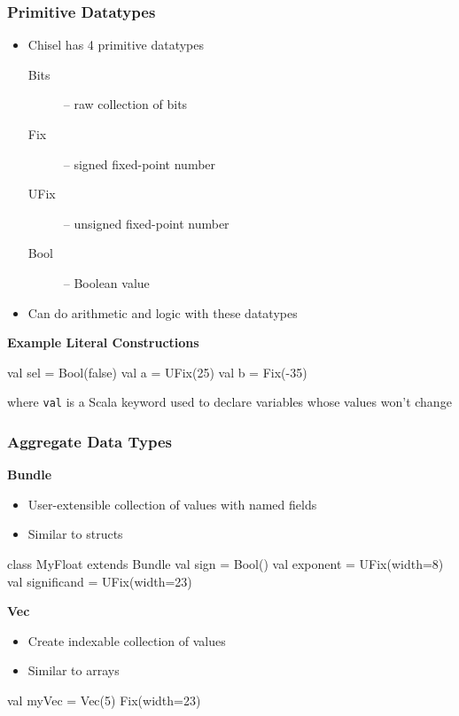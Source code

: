 \documentclass[xcolor=pdflatex,dvipsnames,table]{beamer}
\begin{document}
\begin{frame}[fragile]
\frametitle{Primitive Datatypes}
\begin{itemize}
\item{Chisel has 4 primitive datatypes}
\begin{description}
\item[Bits]  -- raw collection of bits
\item[Fix]   -- signed fixed-point number
\item[UFix] -- unsigned fixed-point number
\item[Bool] -- Boolean value
\end{description}
\item Can do arithmetic and logic with these datatypes
\end{itemize}

\textbf{Example Literal Constructions}
\begin{scala}
val sel = Bool(false)
val a   = UFix(25)
val b   = Fix(-35)
\end{scala}
where \verb+val+ is a Scala keyword used to declare variables whose values won't change
\end{frame}

\begin{frame}[fragile]
\frametitle{Aggregate Data Types}

\textbf{Bundle}

\begin{itemize}
\item User-extensible collection of values with named fields
\item Similar to structs
\end{itemize}

\begin{footnotesize}
\begin{scala}
class MyFloat extends Bundle{
  val sign        = Bool()
  val exponent    = UFix(width=8)
  val significand = UFix(width=23)
}
\end{scala}
\end{footnotesize}

\textbf{Vec}

\begin{itemize}
\item Create indexable collection of values
\item Similar to arrays
\end{itemize}

\begin{footnotesize}
\begin{scala}
val myVec = Vec(5){ Fix(width=23) }
\end{scala}
\end{footnotesize}

\end{frame}
\end{document}
